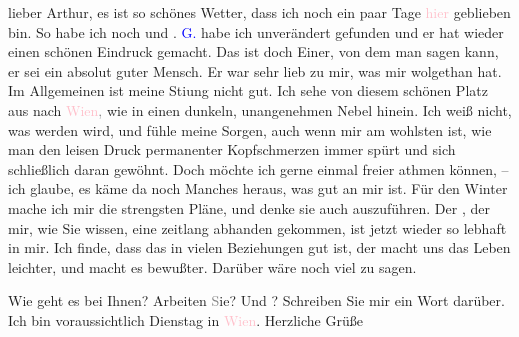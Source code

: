 \pstart
           lieber Arthur, es ist so schönes Wetter, dass ich noch ein paar Tage
                  \textcolor{pink}{hier}{}\ledrightnote{{$\rightarrow$}\textcolor{pink}{Salzburg}} geblieben bin. So habe
               ich noch \label{K_L03274-1v}\label{K_L03274-1h} und
                  \label{K_L03274-2v}\label{K_L03274-2h}. \textcolor{blue}{G.}{}\ledrightnote{\textcolor{blue}{Paul Goldmann}} habe ich unverändert gefunden und
               er hat wieder einen schönen Eindruck gemacht. Das ist doch Einer, von dem man sagen
               kann, er sei ein absolut guter Mensch. Er war sehr lieb zu mir, was mir wolgethan
               hat. Im Allgemeinen ist meine Sti{\geminationm}ung nicht gut. Ich
               sehe von diesem schönen Platz aus nach \textcolor{pink}{Wien}{}\ledrightnote{\textcolor{pink}{Wien}}\textcolor{gray}{,} wie in einen dunkeln, unangenehmen Nebel hinein.
               Ich weiß nicht, was werden wird, und fühle meine Sorgen, auch wenn mir am wohlsten
               ist, wie man den leisen Druck permanenter Kopfschmerzen immer spürt und sich
               schließlich daran gewöhnt. Doch möchte ich gerne einmal freier athmen können, – ich
               glaube, {\pb}es käme da noch
               Manches heraus, was gut an mir ist. Für den Winter mache ich mir die strengsten
               Pläne, und denke sie auch auszuführen. Der \label{K_L03274-3v}\label{K_L03274-3h}, der mir, wie Sie wissen, eine zeitlang abhanden gekommen, ist jetzt wieder
               so lebhaft in mir. Ich finde, dass das in vielen Beziehungen gut ist, der macht uns
               das Leben leichter, und macht es bewußter. Darüber wäre noch viel zu sagen.\pend
           
\pstart
           Wie geht es bei Ihnen? Arbeiten \textcolor{gray}{S}ie? Und \label{K_L03274-4v}\label{K_L03274-4h}?
               Schreiben Sie mir ein Wort darüber. Ich bin voraussichtlich Dienstag in \textcolor{pink}{Wien}{}\ledrightnote{\textcolor{pink}{Wien}}. Herzliche Grüße\pend
           
